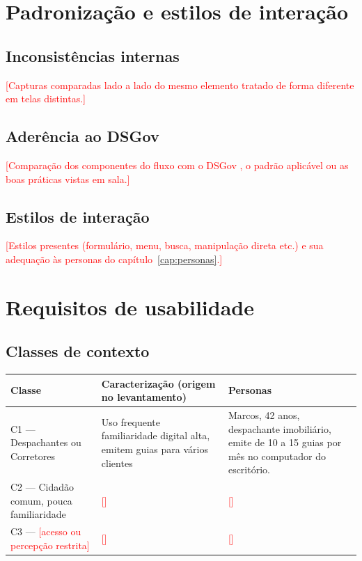 \documentclass[
  12pt,
  oneside,
  a4paper,
  chapter=TITLE,
  section=TITLE,
  english,
  brazil
]{abntex2}
\newcommand{\preencher}[1]{\textcolor{red}{[#1]}}
\begin{document}
\chapter{Padronização e estilos de interação}\label{cap:padronizacao}

\section{Inconsistências internas}
\preencher{Capturas comparadas lado a lado do mesmo elemento tratado de forma
diferente em telas distintas.}

\section{Aderência ao DSGov}
\preencher{Comparação dos componentes do fluxo com o DSGov \cite{dsgov}, o padrão
aplicável ou as boas práticas vistas em sala.}

\section{Estilos de interação}
\preencher{Estilos presentes (formulário, menu, busca, manipulação direta etc.) e
sua adequação às personas do capítulo~\ref{cap:personas}.}

\chapter{Requisitos de usabilidade}\label{cap:requisitos}

\section{Classes de contexto}

\begin{quadro}[htbp]
  \caption{Classes de contexto}\label{qua:classes}
  \centering\small
  \begin{tabularx}{\textwidth}{|l|X|l|}\hline
    \textbf{Classe} & \textbf{Caracterização (origem no levantamento)} & \textbf{Personas} \\\hline
    C1 --- Despachantes ou Corretores & Uso frequente familiaridade digital alta, emitem guias para vários clientes & Marcos, 42 anos, despachante imobiliário, emite de 10 a 15 guias por mês no computador do escritório. \\\hline
    C2 --- Cidadão comum, pouca familiaridade & \preencher{} & \preencher{} \\\hline
    C3 --- \preencher{acesso ou percepção restrita} & \preencher{} & \preencher{} \\\hline
  \end{tabularx}
\end{quadro}
\end{document}

